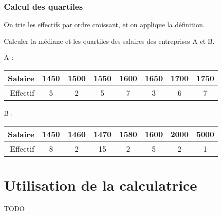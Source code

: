 \subsubsection{Calcul des quartiles}

On trie les effectifs par ordre croissant, et on applique la définition.

\begin{exemple}
Calculer la médiane et les quartiles des salaires des entreprises A et B.

  A :
  \begin{tabular}{r|c|c|c|c|c|c|c}
    Salaire  & 1450 & 1500 & 1550 & 1600 & 1650 & 1700 & 1750 \\
    \hline
    Effectif & 5    &  2   &  5   &  7   &  3   &  6   & 7    \\
  \end{tabular}

  B :
  \begin{tabular}{r|c|c|c|c|c|c|c}
    Salaire  & 1450 & 1460 & 1470 & 1580 & 1600 & 2000 & 5000 \\
    \hline
    Effectif & 8    &  2   & 15   &  2   &  5   &  2   & 1    \\
  \end{tabular}
\end{exemple}


\section{Utilisation de la calculatrice}

TODO
